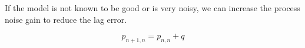         If the model is not known to be good or is very noisy, we can increase the process noise gain to reduce the lag error.

        \begin{equation}
            p_{n+1,n} = p_{n,n} + q
        \end{equation}
